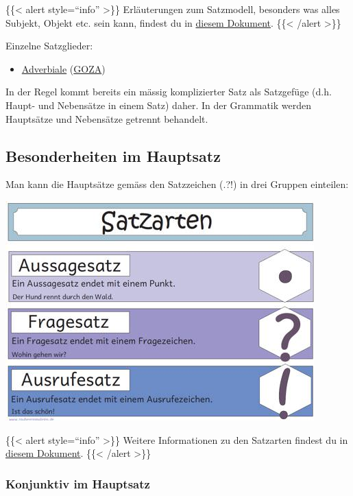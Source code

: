 \documentclass{scrartcl}
\begin{document}
\{\{< alert style="`info"' >\}\}
Erläuterungen zum Satzmodell, besonders was alles Subjekt, Objekt
etc. sein kann, findest du in \href{https://www.dropbox.com/s/id081k5itrib85b/Z19\_Satzmodell.pdf?dl=0}{diesem Dokument}. 
\{\{< /alert >\}\}

Einzelne Satzglieder:
\begin{itemize}
\item \href{https://www.dropbox.com/s/wr2x8xo41ig6jlf/Adverbiale.pdf?dl=0}{Adverbiale} (\href{https://www.dropbox.com/s/pw7znlffgywbows/AC7AdverbialeGOZA.pdf?dl=0}{GOZA})
\end{itemize}

In der Regel kommt bereits ein mässig komplizierter Satz als
Satzgefüge (d.h. Haupt- und Nebensätze in einem Satz) daher. In der
Grammatik werden Hauptsätze und Nebensätze getrennt behandelt.

\subsection{Besonderheiten im Hauptsatz}
\label{sec:orgf9a56f4}

Man kann die Hauptsätze gemäss den Satzzeichen (.?!) in drei Gruppen
einteilen:

\begin{center}
\includegraphics[width=.9\linewidth]{satzarten.jpg}
\label{org005207f}
\end{center}

\{\{< alert style="`info"' >\}\}
Weitere Informationen zu den Satzarten findest du in \href{https://www.dropbox.com/s/fskiu3e5rj485xp/Satzgrammatik.pdf?dl=0}{diesem Dokument}.
\{\{< /alert >\}\}

\subsubsection{Konjunktiv im Hauptsatz}
\label{sec:org5867d8d}
\end{document}
